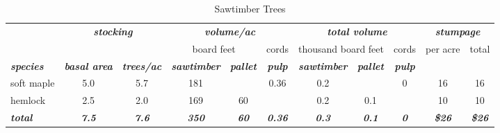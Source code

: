 \documentclass[landscape]{article}
\begin{document}
\begin{table}[H]

\caption{\label{tab:unnamed-chunk-26}Sawtimber Trees}
\fontsize{10}{12}\selectfont
\begin{tabular}[t]{lcccccccccc}
\toprule
\multicolumn{1}{c}{\em{\textbf{ }}} & \multicolumn{2}{c}{\em{\textbf{stocking}}} & \multicolumn{3}{c}{\em{\textbf{volume/ac }}} & \multicolumn{3}{c}{\em{\textbf{total volume}}} & \multicolumn{2}{c}{\em{\textbf{stumpage}}} \\
\cmidrule(l{3pt}r{3pt}){2-3} \cmidrule(l{3pt}r{3pt}){4-6} \cmidrule(l{3pt}r{3pt}){7-9} \cmidrule(l{3pt}r{3pt}){10-11}
\multicolumn{3}{c}{ } & \multicolumn{2}{c}{board feet} & \multicolumn{1}{c}{cords} & \multicolumn{2}{c}{thousand board feet} & \multicolumn{1}{c}{cords} & \multicolumn{1}{c}{per acre} & \multicolumn{1}{c}{total} \\
\cmidrule(l{3pt}r{3pt}){4-5} \cmidrule(l{3pt}r{3pt}){6-6} \cmidrule(l{3pt}r{3pt}){7-8} \cmidrule(l{3pt}r{3pt}){9-9} \cmidrule(l{3pt}r{3pt}){10-10} \cmidrule(l{3pt}r{3pt}){11-11}
\rowcolor[HTML]{DCDCDC}  \em{\textbf{species}} & \em{\textbf{basal area}} & \em{\textbf{trees/ac}} & \em{\textbf{sawtimber}} & \em{\textbf{pallet}} & \em{\textbf{pulp}} & \em{\textbf{sawtimber}} & \em{\textbf{pallet}} & \em{\textbf{pulp}} & \em{\textbf{ }} & \em{\textbf{ }}\\
\midrule
\rowcolor{gray!6}  soft maple & 5.0 & 5.7 & 181 &  & 0.36 & 0.2 &  & 0 & 16 & 16\\
 
hemlock & 2.5 & 2.0 & 169 & 60 &  & 0.2 & 0.1 &  & 10 & 10\\
 
\rowcolor{gray!6}  \rowcolor[HTML]{DCDCDC}  \em{\textbf{total}} & \em{\textbf{7.5}} & \em{\textbf{7.6}} & \em{\textbf{350}} & \em{\textbf{60}} & \em{\textbf{0.36}} & \em{\textbf{0.3}} & \em{\textbf{0.1}} & \em{\textbf{0}} & \em{\textbf{\$26}} & \em{\textbf{\$26}}\\
\bottomrule
\end{tabular}
\end{table}
\end{document}
